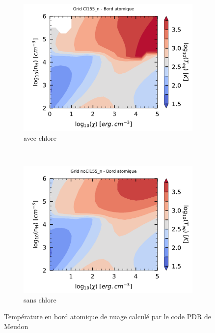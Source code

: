 \begin{figure}[!h]
    \centering
    \begin{subfigure}[t]{0.49\textwidth} %
        \centering \includegraphics[trim = {0 0 0 1cm},clip,width=1\textwidth]{figure/Cl/gridCl155_n/mapTba.pdf}
        \caption{avec chlore}
    \end{subfigure}
    ~ 
    \begin{subfigure}[t]{0.49\textwidth}
        \centering \includegraphics[trim = {0 0 0 1cm},clip,width=1\textwidth]{figure/Cl/gridnoCl155_n/mapTba.pdf}
        \caption{sans chlore}
        \label{fig:Cl:grid:Tba:noCl}
    \end{subfigure}
    \caption{Température en bord atomique de nuage calculé par le code PDR de Meudon}
    \label{fig:Cl:grid:Tba}
\end{figure}



